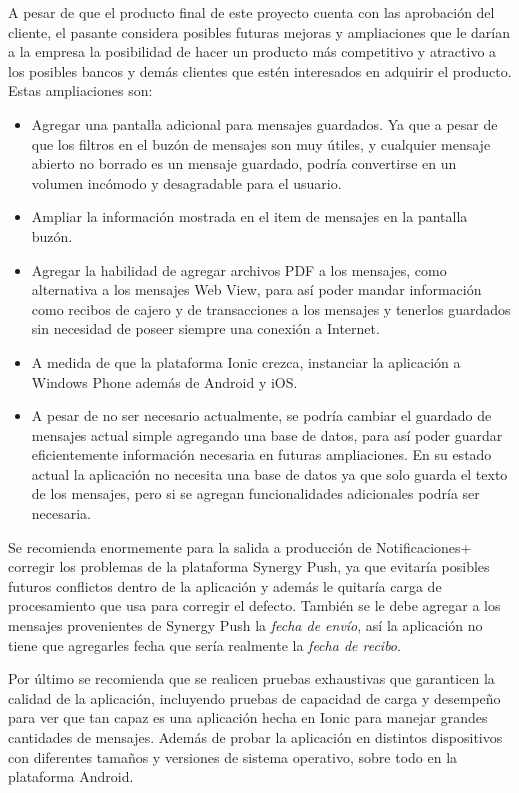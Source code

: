 A pesar de que el producto final de este proyecto cuenta con las aprobación del cliente, el pasante considera posibles futuras mejoras y ampliaciones que le darían a la empresa la posibilidad de hacer un producto más competitivo y atractivo a los posibles bancos y demás clientes que estén interesados en adquirir el producto. Estas ampliaciones son:
\smallskip
\begin{itemize}[noitemsep,nolistsep]
	\item Agregar una pantalla adicional para mensajes guardados. Ya que a pesar de que los filtros en el buzón de mensajes son muy útiles, y cualquier mensaje abierto no borrado es un mensaje guardado, podría convertirse en un volumen incómodo y desagradable para el usuario.  
	\item Ampliar la información mostrada en el item de mensajes en la pantalla buzón.
	\item Agregar la habilidad de agregar archivos PDF a los mensajes, como alternativa a los mensajes Web View, para así poder mandar información como recibos de cajero y de transacciones a los mensajes y tenerlos guardados sin necesidad de poseer siempre una conexión a Internet.
	\item A medida de que la plataforma Ionic crezca, instanciar la aplicación a Windows Phone además de Android y iOS.
	\item A pesar de no ser necesario actualmente, se podría cambiar el guardado de mensajes actual simple agregando una base de datos, para así poder guardar eficientemente información necesaria en futuras ampliaciones. En su estado actual la aplicación no necesita una base de datos ya que solo guarda el texto de los mensajes, pero si se agregan funcionalidades adicionales podría ser necesaria.
\end{itemize}
\bigskip

Se recomienda enormemente para la salida a producción de Notificaciones+ corregir los problemas de la plataforma Synergy Push, ya que evitaría posibles futuros conflictos dentro de la aplicación y además le quitaría carga de procesamiento que usa para corregir el defecto. También se le debe agregar a los mensajes provenientes de Synergy Push la \textit{fecha de envío}, así la aplicación no tiene que agregarles fecha que sería realmente la \textit{fecha de recibo}.


Por último se recomienda que se realicen pruebas exhaustivas que garanticen la calidad de la aplicación, incluyendo pruebas de capacidad de carga y desempeño para ver que tan capaz es una aplicación hecha en Ionic para manejar grandes cantidades de mensajes. Además de probar la aplicación en distintos dispositivos con diferentes tamaños y versiones de sistema operativo, sobre todo en la plataforma Android.


